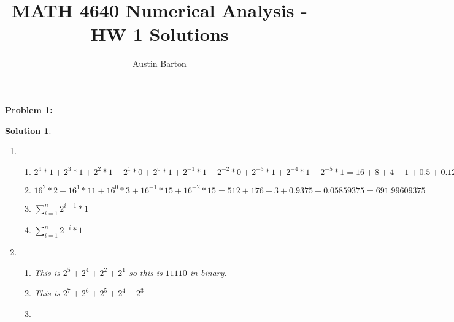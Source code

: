 \documentclass[12pt, letterpaper]{article}
\title{MATH 4640 Numerical Analysis - HW 1 Solutions}
\author{Austin Barton}
\theoremstyle{nonumberplain}
\newtheorem{sol}{Solution}
\begin{document}
\maketitle

\vspace{2em}
\hspace{18pt}\textbf{Problem 1:} \medskip
\begin{sol}
	\begin{enumerate}[label=\roman*.]
		\item
		      \begin{enumerate}[label=\alph*)]
			      \item $2^4 * 1 + 2^3 * 1 + 2^2 * 1 + 2^1 * 0 + 2^0 * 1 + 2^{-1} * 1 + 2^{-2} * 0 + 2^{-3} * 1 + 2^{-4} * 1 + 2^{-5} * 1 = 16 + 8 + 4 + 1 + 0.5 + 0.125 + 0.0625 +  0.03125 = 29.71875$
			      \item $16^2 * 2 + 16^1 * 11 + 16^0 * 3 + 16^{-1} * 15 + 16^{-2} * 15 = 512 + 176 + 3 + 0.9375 + 0.05859375 = 691.99609375$
			      \item $\sum_{i = 1}^n 2^{i-1} * 1$
			      \item $\sum_{i = 1}^n 2^{-i} * 1$
		      \end{enumerate}
		\item
		      \begin{enumerate}[label=\alph*)]
			      \item This is $2^5 + 2^4 + 2^2 + 2^1$ so this is $11110$ in binary.
			      \item This is $2^7 +2^6 + 2^5 + 2^4 + 2^3$
			      \item
		      \end{enumerate}
	\end{enumerate}
\end{sol}
\end{document}
